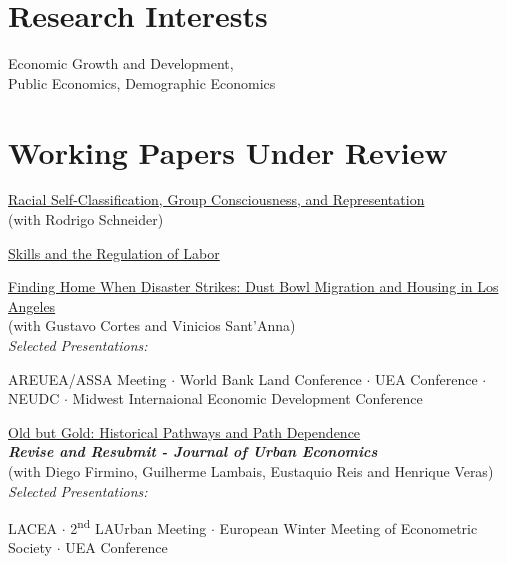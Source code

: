 \documentclass[mm, 10pt]{simple_style}
\begin{document}
\begin{resume}
\section{Research Interests}

Economic Growth and Development,   \\
Public Economics, Demographic Economics

\section{Working Papers Under Review}
\href{https://www.usf.edu/arts-sciences/departments/economics/documents/wpaper/2025-04.pdf}{Racial Self-Classification, Group Consciousness, and Representation} \\
(with Rodrigo Schneider)

\href{https://www.usf.edu/arts-sciences/departments/economics/documents/wpaper/2025-03.pdf}{Skills and the Regulation of Labor}

\href{https://www.usf.edu/arts-sciences/departments/economics/documents/wpaper/2024-05.pdf}{Finding Home When Disaster Strikes: Dust Bowl Migration and Housing in Los Angeles} \\
(with Gustavo Cortes and Vinicios Sant'Anna) \\
\textit{Selected Presentations:} 
\begin{minipage}[t]{0.7\textwidth}
AREUEA/ASSA Meeting
$\cdot$ {World Bank Land Conference}
$\cdot$ {UEA Conference}
$\cdot$ {NEUDC}
$\cdot$ {Midwest Internaional Economic Development Conference}
\end{minipage}

\href{https://papers.ssrn.com/sol3/papers.cfm?abstract_id=4513384}{Old but Gold: Historical Pathways and Path Dependence} \\
\textit{\textbf{Revise and Resubmit - Journal of Urban Economics}} \\
(with Diego Firmino, Guilherme Lambais, Eustaquio Reis and Henrique Veras) \\
\textit{Selected Presentations:} 
\begin{minipage}[t]{0.7\textwidth}
{LACEA}
$\cdot$ {2\textsuperscript{nd} LAUrban Meeting}
$\cdot$ {European Winter Meeting of Econometric Society}
$\cdot$ {UEA Conference}


\end{minipage}
\end{resume}
\end{document}
